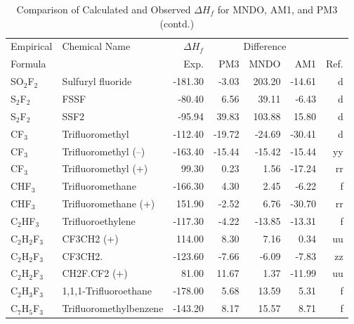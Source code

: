 \begin{table}
\caption{Comparison of Calculated and Observed $\Delta H_f$ 
for MNDO, AM1, and PM3 (contd.)}
\begin{center}
\compresstable
\begin{tabular}{llrrrrr}
Empirical & Chemical Name & $\Delta H_f$ & \multicolumn{3}{c}{Difference} & \\
Formula   &               & Exp. & PM3 &  MNDO  &  AM1 &     Ref.\\
\hline
 SO$_2$F$_2$       & Sulfuryl fluoride               &  -181.30    &    -3.03  &   203.20  &   -14.61  &      d\\
 S$_2$F$_2$        & FSSF                            &   -80.40    &     6.56  &    39.11  &    -6.43  &      d\\
 S$_2$F$_2$        & SSF2                            &   -95.94    &    39.83  &   103.88  &    15.80  &      d\\
 CF$_3$         & Trifluoromethyl                    & -112.40    &   -19.72  &   -24.69  &   -30.41  &      d\\
 CF$_3$         & Trifluoromethyl (--)             &  -163.40    &   -15.44  &   -15.42  &   -15.44  &     yy\\
 CF$_3$         & Trifluoromethyl (+)             &    99.30    &     0.23  &     1.56  &   -17.24  &     rr\\
 CHF$_3$        & Trifluoromethane                &  -166.30    &     4.30  &     2.45  &    -6.22  &      f\\
 CHF$_3$        & Trifluoromethane (+)            &   151.90    &    -2.52  &     6.76  &   -30.70  &     rr\\
 C$_2$HF$_3$       & Trifluoroethylene               &  -117.30    &    -4.22  &   -13.85  &   -13.31  &      f\\
 C$_2$H$_2$F$_3$      & CF3CH2 (+)                      &   114.00    &     8.30  &     7.16  &     0.34  &     uu\\
 C$_2$H$_2$F$_3$      & CF3CH2.                         &  -123.60    &    -7.66  &    -6.09  &    -7.83  &     zz\\
 C$_2$H$_2$F$_3$      & CH2F.CF2 (+)                    &    81.00    &    11.67  &     1.37  &   -11.99  &     uu\\
 C$_2$H$_3$F$_3$      & 1,1,1-Trifluoroethane           &  -178.00    &     5.68  &    13.59  &     5.31  &      f\\
 C$_7$H$_5$F$_3$      & Trifluoromethylbenzene          &  -143.20    &     8.17  &    15.57  &     8.71  &      f\\

\end{tabular}
\end{center}
\end{table}
